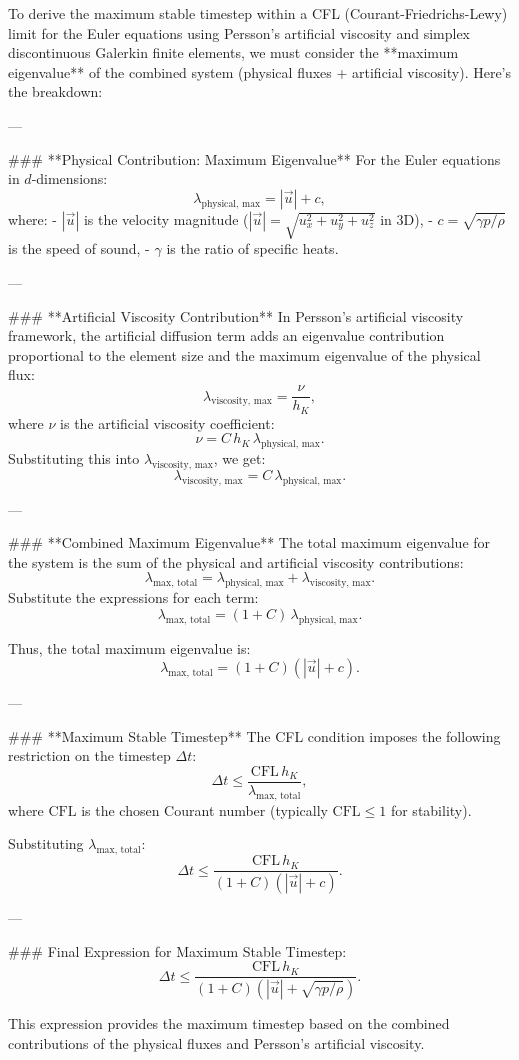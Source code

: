 To derive the maximum stable timestep within a CFL (Courant-Friedrichs-Lewy) limit for the Euler equations using Persson's artificial viscosity and simplex discontinuous Galerkin finite elements, we must consider the **maximum eigenvalue** of the combined system (physical fluxes + artificial viscosity). Here's the breakdown:

---

### **Physical Contribution: Maximum Eigenvalue**
For the Euler equations in \(d\)-dimensions:
\[
\lambda_{\text{physical, max}} = |\vec{u}| + c,
\]
where:
- \(|\vec{u}|\) is the velocity magnitude (\(|\vec{u}| = \sqrt{u_x^2 + u_y^2 + u_z^2}\) in 3D),
- \(c = \sqrt{\gamma p / \rho}\) is the speed of sound,
- \(\gamma\) is the ratio of specific heats.

---

### **Artificial Viscosity Contribution**
In Persson's artificial viscosity framework, the artificial diffusion term adds an eigenvalue contribution proportional to the element size and the maximum eigenvalue of the physical flux:
\[
\lambda_{\text{viscosity, max}} = \frac{\nu}{h_K},
\]
where \(\nu\) is the artificial viscosity coefficient:
\[
\nu = C \, h_K \, \lambda_{\text{physical, max}}.
\]
Substituting this into \(\lambda_{\text{viscosity, max}}\), we get:
\[
\lambda_{\text{viscosity, max}} = C \, \lambda_{\text{physical, max}}.
\]

---

### **Combined Maximum Eigenvalue**
The total maximum eigenvalue for the system is the sum of the physical and artificial viscosity contributions:
\[
\lambda_{\text{max, total}} = \lambda_{\text{physical, max}} + \lambda_{\text{viscosity, max}}.
\]
Substitute the expressions for each term:
\[
\lambda_{\text{max, total}} = (1 + C) \, \lambda_{\text{physical, max}}.
\]

Thus, the total maximum eigenvalue is:
\[
\lambda_{\text{max, total}} = (1 + C)(|\vec{u}| + c).
\]

---

### **Maximum Stable Timestep**
The CFL condition imposes the following restriction on the timestep \(\Delta t\):
\[
\Delta t \leq \frac{\text{CFL} \, h_K}{\lambda_{\text{max, total}}},
\]
where \(\text{CFL}\) is the chosen Courant number (typically \(\text{CFL} \leq 1\) for stability).

Substituting \(\lambda_{\text{max, total}}\):
\[
\Delta t \leq \frac{\text{CFL} \, h_K}{(1 + C)(|\vec{u}| + c)}.
\]

---

### Final Expression for Maximum Stable Timestep:
\[
\Delta t \leq \frac{\text{CFL} \, h_K}{(1 + C)(|\vec{u}| + \sqrt{\gamma p / \rho})}.
\]

This expression provides the maximum timestep based on the combined contributions of the physical fluxes and Persson's artificial viscosity.
